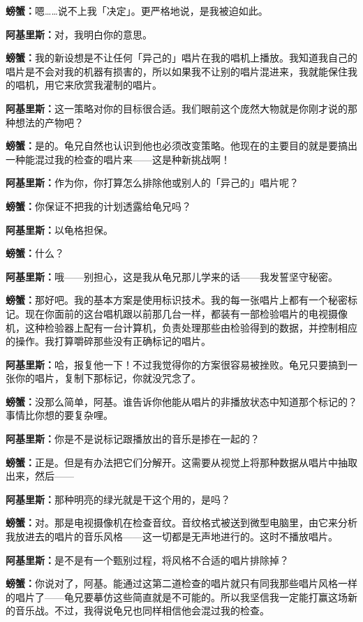 \documentclass[
  12pt,
  twoside,
  openright,
  oldfontcommands,
]{memoir}
\newcommand{\dialogname}[1]{{\heifamily\bfseries #1}}
\begin{document}
\dialogname{螃蟹：}嗯\ldots\ldots 说不上我「决定」。更严格地说，是我被迫如此。

\dialogname{阿基里斯：}对，我明白你的意思。

\dialogname{螃蟹：}我的新设想是不让任何「异己的」唱片在我的唱机上播放。我知道我自己的唱片是不会对我的机器有损害的，所以如果我不让别的唱片混进来，我就能保住我的唱机，用它来欣赏我灌制的唱片。

\dialogname{阿基里斯：}这一策略对你的目标很合适。我们眼前这个庞然大物就是你刚才说的那种想法的产物吧？

\dialogname{螃蟹：}是的。龟兄自然也认识到他也必须改变策略。他现在的主要目的就是要搞出一种能混过我的检查的唱片来------这是种新挑战啊！

\dialogname{阿基里斯：}作为你，你打算怎么排除他或别人的「异己的」唱片呢？

\dialogname{螃蟹：}你保证不把我的计划透露给龟兄吗？

\dialogname{阿基里斯：}以龟格担保。

\dialogname{螃蟹：}什么？

\dialogname{阿基里斯：}哦------别担心，这是我从龟兄那儿学来的话------我发誓坚守秘密。

\dialogname{螃蟹：}那好吧。我的基本方案是使用标识技术。我的每一张唱片上都有一个秘密标记。现在你面前的这台唱机跟以前那几台一样，都装有一部检验唱片的电视摄像机，这种检验器上配有一台计算机，负责处理那些由检验得到的数据，并控制相应的操作。我打算嚼碎那些没有正确标记的唱片。

\dialogname{阿基里斯：}哈，报复他一下！不过我觉得你的方案很容易被挫败。龟兄只要搞到一张你的唱片，复制下那标记，你就没咒念了。

\dialogname{螃蟹：}没那么简单，阿基。谁告诉你他能从唱片的非播放状态中知道那个标记的？事情比你想的要复杂哩。

\dialogname{阿基里斯：}你是不是说标记跟播放出的音乐是掺在一起的？

\dialogname{螃蟹：}正是。但是有办法把它们分解开。这需要从视觉上将那种数据从唱片中抽取出来，然后------

\dialogname{阿基里斯：}那种明亮的绿光就是干这个用的，是吗？

\dialogname{螃蟹：}对。那是电视摄像机在检查音纹。音纹格式被送到微型电脑里，由它来分析我放进去的唱片的音乐风格------这一切都是无声地进行的。这时不播放唱片。

\dialogname{阿基里斯：}是不是有一个甄别过程，将风格不合适的唱片排除掉？

\dialogname{螃蟹：}你说对了，阿基。能通过这第二道检查的唱片就只有同我那些唱片风格一样的唱片了------龟兄要摹仿这些简直就是不可能的。所以我坚信我一定能打赢这场新的音乐战。不过，我得说龟兄也同样相信他会混过我的检查。
\end{document}
